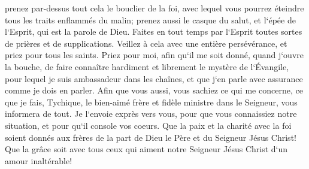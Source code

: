\verse prenez par-dessus tout cela le bouclier de la foi, avec lequel vous pourrez éteindre tous les traits enflammés du malin; 
\verse prenez aussi le casque du salut, et l`épée de l`Esprit, qui est la parole de Dieu. 
\verse Faites en tout temps par l`Esprit toutes sortes de prières et de supplications. Veillez à cela avec une entière persévérance, et priez pour tous les saints. 
\verse Priez pour moi, afin qu`il me soit donné, quand j`ouvre la bouche, de faire connaître hardiment et librement le mystère de l`Évangile, 
\verse pour lequel je suis ambassadeur dans les chaînes, et que j`en parle avec assurance comme je dois en parler. 
\verse Afin que vous aussi, vous sachiez ce qui me concerne, ce que je fais, Tychique, le bien-aimé frère et fidèle ministre dans le Seigneur, vous informera de tout. 
\verse Je l`envoie exprès vers vous, pour que vous connaissiez notre situation, et pour qu`il console vos coeurs. 
\verse Que la paix et la charité avec la foi soient donnés aux frères de la part de Dieu le Père et du Seigneur Jésus Christ! 
\verse Que la grâce soit avec tous ceux qui aiment notre Seigneur Jésus Christ d`un amour inaltérable! 
